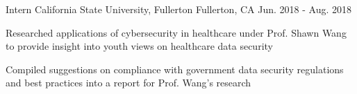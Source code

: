 \begin{cventries}
  \cventry
    {Intern} %
    {California State University, Fullerton} %
    {Fullerton, CA} %
    {Jun. 2018 - Aug. 2018} %
    {
      \begin{cvitems} %
        \item {Researched applications of cybersecurity in healthcare under Prof. Shawn Wang to provide insight into youth views on healthcare data security}
        \item {Compiled suggestions on compliance with government data security regulations and best practices into a report for Prof. Wang's research}
      \end{cvitems}
    }

\end{cventries}
